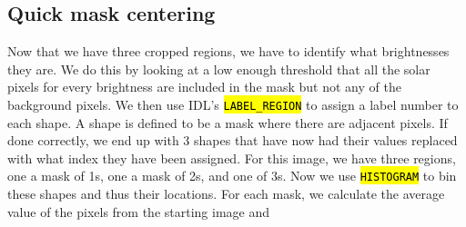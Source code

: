 \documentclass[10pt]{scrartcl}
\begin{document}
\begin{figure}[!ht]
{\begin{subfloatrow}
{        }
        {
        }
    \end{subfloatrow}
        \begin{subfloatrow}
        {
        }
    \end{subfloatrow}
}
{\caption{}
\label{triplecrop}}
\end{figure}


\subsection{Quick mask centering} %
\label{sub:quick_mask_centering}

	Now that we have three cropped regions, we have to identify what brightnesses they are. We do this by looking at a low enough threshold that all the solar pixels for every brightness are included in the mask but not any of the background pixels. We then use IDL's \hl{\texttt{LABEL\_REGION}} to assign a label number to each shape. A shape is defined to be a mask where there are adjacent pixels. If done correctly, we end up with 3 shapes that have now had their values replaced with what index they have been assigned. For this image, we have three regions, one a mask of 1s, one a mask of 2s, and one of 3s. Now we use \hl{\texttt{HISTOGRAM}} to bin these shapes and thus their locations. For each mask, we calculate the average value of the pixels from the starting image and  
\end{document}
